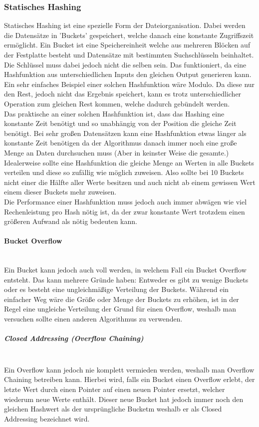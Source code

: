 \documentclass{article}
\newcommand{\paragraphlb}[1]{\paragraph{#1}\mbox{}\\}
\newcommand{\subparagraphlb}[1]{\subparagraph{#1}\mbox{}\\}
\begin{document}
	\subsubsection{Statisches Hashing}
	Statisches Hashing ist eine spezielle Form der Dateiorganisation. Dabei werden die Datensätze in 'Buckets' gespeichert, welche danach eine konstante Zugriffszeit ermöglicht. Ein Bucket ist eine Speichereinheit welche aus mehreren Blöcken auf der Festplatte besteht und Datensätze mit bestimmten Suchschlüsseln beinhaltet. Die Schlüssel muss dabei jedoch nicht die selben sein. Das funktioniert, da eine Hashfunktion aus unterschiedlichen Inputs den gleichen Output generieren kann. Ein sehr einfaches Beispiel einer solchen Hashfunktion wäre Modulo. Da diese nur den Rest, jedoch nicht das Ergebnis speichert, kann es trotz unterschiedlicher Operation zum gleichen Rest kommen, welche dadurch gebündelt werden. \\
	Das praktische an einer solchen Hashfunktion ist, dass das Hashing eine konstante Zeit benötigt und so unabhängig von der Position die gleiche Zeit benötigt. Bei sehr großen Datensätzen kann eine Hashfunktion etwas länger als konstante Zeit benötigen da der Algorithmus danach immer noch eine große Menge an Daten durchsuchen muss (Aber in keinster Weise die gesamte.) 	Idealerweise sollte eine Hashfunktion die gleiche Menge an Werten in alle Buckets verteilen und diese so zufällig wie möglich zuweisen. Also sollte bei 10 Buckets nicht einer die Hälfte aller Werte besitzen und auch nicht ab einem gewissen Wert einem dieser Buckets mehr zuweisen. \\
	Die Performance einer Hashfunktion muss jedoch auch immer abwägen wie viel Rechenleistung pro Hash nötig ist, da der zwar konstante Wert trotzdem einen größeren Aufwand als nötig bedeuten kann.
	\paragraphlb{Bucket Overflow}
	Ein Bucket kann jedoch auch voll werden, in welchem Fall ein Bucket Overflow entsteht. Das kann mehrere Gründe haben: Entweder es gibt zu wenige Buckets oder es besteht eine ungleichmäßige Verteilung der Buckets. Während ein einfacher Weg wäre die Größe oder Menge der Buckets zu erhöhen, ist in der Regel eine ungleiche Verteilung der Grund für einen Overflow, weshalb man versuchen sollte einen anderen Algorithmus zu verwenden.
	\subparagraphlb{Closed Addressing (Overflow Chaining)}
	Ein Overflow kann jedoch nie komplett vermieden werden, weshalb man Overflow Chaining betreiben kann. Hierbei wird, falls ein Bucket einen Overflow erlebt, der letzte Wert durch einen Pointer auf einen neuen Pointer ersetzt, welcher wiederum neue Werte enthält. Dieser neue Bucket hat jedoch immer noch den gleichen Hashwert als der ursprüngliche Bucketm weshalb er als Closed Addressing bezeichnet wird.
\end{document}
